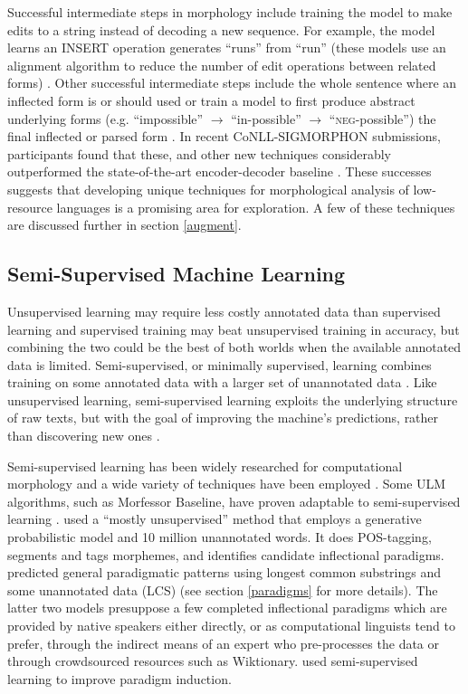 \documentclass[12pt]{article}
\begin{document}
Successful intermediate steps in morphology include training the model to make edits to a string instead of decoding a new sequence. For example, the model learns an INSERT operation generates ``runs'' from ``run'' (these models use an alignment algorithm to reduce the number of edit operations between related forms) \cite{makarov_align_2017,makarov_uzh_2018}. Other successful intermediate steps include the whole sentence where an inflected form is or should used or train a model to first produce abstract underlying forms (e.g. ``impossible'' $\rightarrow$ ``in-possible'' $\rightarrow$ ``\textsc{neg}-possible'') the final inflected or parsed form \cite{liu_morphological_2018,moeller_improving_2019}. In recent CoNLL-SIGMORPHON submissions, participants found that these, and other new techniques considerably outperformed the state-of-the-art encoder-decoder baseline \cite{bergmanis_training_2017}. These successes suggests that developing unique techniques for morphological analysis of low-resource languages is a promising area for exploration. A few of these techniques are discussed further in section \ref{augment}. 

\subsection{Semi-Supervised Machine Learning}
\label{semi-supervised}

Unsupervised learning may require less costly annotated data than supervised learning and supervised training may beat unsupervised training in accuracy, but combining the two could be the best of both worlds when the available annotated data is limited. Semi-supervised, or minimally supervised, learning combines training on some annotated data with a larger set of unannotated data \cite{kohonen_semi-supervised_2010,poon_unsupervised_2009}. Like unsupervised learning, semi-supervised learning exploits the underlying structure of raw texts, but with the goal of improving the machine’s predictions, rather than discovering new ones \cite{settles_active_2010}. 

Semi-supervised learning has been widely researched for computational morphology and a wide variety of techniques have been employed \cite{ruokolainen_comparative_2016}. Some ULM algorithms, such as Morfessor Baseline, have proven adaptable to semi-supervised learning \cite{kohonen_semi-supervised_2010}.  used a ``mostly unsupervised'' method that employs a generative probabilistic model and 10 million unannotated words. It does POS-tagging, segments and tags morphemes, and identifies candidate inflectional paradigms.  predicted general paradigmatic patterns using longest common substrings and some unannotated data (LCS) (see section \ref{paradigms} for more details). The latter two models presuppose a few completed inflectional paradigms which are provided by native speakers either directly, or as computational linguists tend to prefer, through the indirect means of an expert who pre-processes the data or through crowdsourced resources such as Wiktionary.  used semi-supervised learning to improve paradigm induction.
\end{document}
